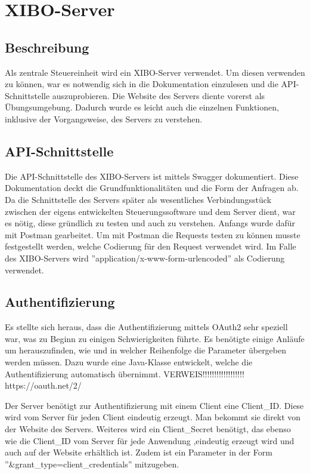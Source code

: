 \chapter{XIBO-Server}
\section{Beschreibung}
Als zentrale Steuereinheit wird ein XIBO-Server verwendet. Um diesen verwenden zu können, war es notwendig sich in die Dokumentation einzulesen und die API-Schnittstelle auszuprobieren. Die Website des Servers diente vorerst als Übungsumgebung. Dadurch wurde es leicht auch die einzelnen Funktionen, inklusive der Vorgangsweise, des Servers zu verstehen.

\section{API-Schnittstelle}
Die API-Schnittstelle des XIBO-Servers ist mittels Swagger dokumentiert. Diese Dokumentation deckt die Grundfunktionalitäten und die Form der Anfragen ab. Da die Schnittstelle des Servers später als wesentliches Verbindungsstück zwischen der eigens entwickelten Steuerungssoftware und dem Server dient, war es nötig, diese gründlich zu testen und auch zu verstehen. Anfangs wurde dafür mit Postman gearbeitet. Um mit Postman die Requests testen zu können musste festgestellt werden, welche Codierung für den Request verwendet wird. Im Falle des XIBO-Servers wird ''application/x-www-form-urlencoded'' als Codierung verwendet.


\section{Authentifizierung}
Es stellte sich heraus, dass die Authentifizierung mittels OAuth2 sehr speziell war, was zu Beginn zu einigen Schwierigkeiten führte. Es benötigte einige Anläufe  um herauszufinden, wie und in welcher Reihenfolge die Parameter übergeben werden müssen. Dazu wurde eine Java-Klasse entwickelt, welche die Authentifizierung automatisch übernimmt.
VERWEIS!!!!!!!!!!!!!!!!!!
https://oauth.net/2/

Der Server benötigt zur Authentifizierung mit einem Client eine Client\_ID. Diese wird vom Server für jeden Client eindeutig erzeugt. Man bekommt sie direkt von der Website des Servers. 
Weiteres wird ein Client\_Secret benötigt, das ebenso wie die Client\_ID vom Server für jede Anwendung ,eindeutig erzeugt wird und auch auf der Website erhältlich ist. Zudem ist ein Parameter in der Form ''&grant\_type=client\_credentials'' mitzugeben.

